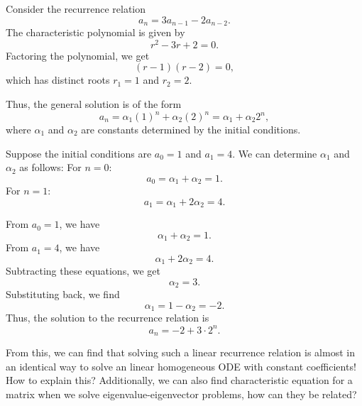\documentclass[12pt,a4paper]{article}
\begin{document}
\begin{example}
Consider the recurrence relation
\begin{equation*}
    a_n = 3a_{n-1} - 2a_{n-2}.
\end{equation*}
The characteristic polynomial is given by
\begin{equation*}
    r^2 - 3r + 2 = 0.
\end{equation*}
Factoring the polynomial, we get
\begin{equation*}
    (r - 1)(r - 2) = 0,
\end{equation*}
which has distinct roots $r_1 = 1$ and $r_2 = 2$.

Thus, the general solution is of the form
\begin{equation}
    a_n = \alpha_1 (1)^n + \alpha_2 (2)^n = \alpha_1 + \alpha_2 2^n,
\end{equation}
where $\alpha_1$ and $\alpha_2$ are constants determined by the initial conditions.

Suppose the initial conditions are $a_0 = 1$ and $a_1 = 4$. We can determine $\alpha_1$ and $\alpha_2$ as follows:
For $n = 0$:
\begin{equation*}
    a_0 = \alpha_1 + \alpha_2 = 1.
\end{equation*}
For $n = 1$:
\begin{equation*}
    a_1 = \alpha_1 + 2\alpha_2 = 4.
\end{equation*}

From $a_0 = 1$, we have
\begin{equation*}
    \alpha_1 + \alpha_2 = 1.
\end{equation*}
From $a_1 = 4$, we have
\begin{equation*}
    \alpha_1 + 2\alpha_2 = 4.
\end{equation*}
Subtracting these equations, we get
\begin{equation*}
    \alpha_2 = 3.
\end{equation*}
Substituting back, we find
\begin{equation*}
    \alpha_1 = 1 - \alpha_2 = -2.
\end{equation*}
Thus, the solution to the recurrence relation is
\begin{equation}
    a_n = -2 + 3 \cdot 2^n.
\end{equation}
\end{example}

From this, we can find that solving such a linear recurrence relation is almost in an identical way to solve an linear homogeneous ODE with constant coefficients! How to explain this? Additionally, we can also find characteristic equation for a matrix when we solve eigenvalue-eigenvector problems, how can they be related?
\end{document}
